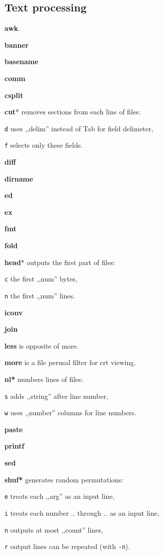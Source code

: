 \subsection{Text processing}

\textbf{awk}.

\textbf{banner}

\textbf{basename}

\textbf{comm}

\textbf{csplit}

\textbf{cut}* removes sections from each line of files:
\begin{enumx}
	\item [\texttt{d}] uses ,,delim'' instead of Tab for field delimeter,
	\item [\texttt{f}] selects only these fields.
\end{enumx}

\textbf{diff}

\textbf{dirname}

\textbf{ed}

\textbf{ex}

\textbf{fmt}

\textbf{fold}

\textbf{head}* outputs the first part of files:
\begin{enumx}
	\item [\texttt{c}] the first ,,num'' bytes,
	\item [\texttt{n}] the first ,,num'' lines.
\end{enumx}

\textbf{iconv}

\textbf{join}

\textbf{less} is opposite of more.

\textbf{more} is a file perusal filter for crt viewing.

\textbf{nl*} numbers lines of files:
\begin{enumx}
	\item [\texttt{s}] adds ,,string'' after line number,
	\item [\texttt{w}] uses ,,number'' columns for line numbers.
\end{enumx}

\textbf{paste}

\textbf{printf}

\textbf{sed}

\textbf{shuf*} generates random permutations:
\begin{enumx}
	\item [\texttt{e}] treats each ,,arg'' as an input line,
	\item [\texttt{i}] treats each number .. through .. as an input line, 
	\item [\texttt{n}] outputs at most ,,count'' lines,
	\item [\texttt{r}] output lines can be repeated (with \texttt{-n}).
\end{enumx}

